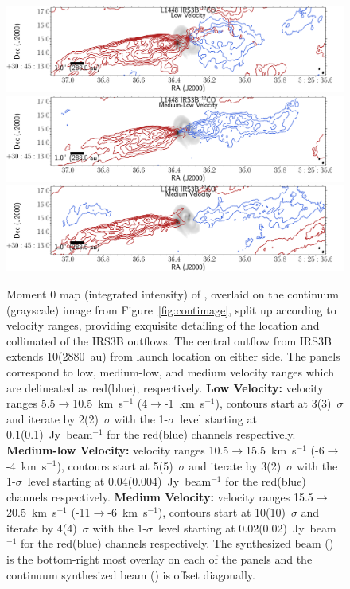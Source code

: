 

\begin{figure}[H]
   \begin{center}
   \includegraphics[width=\textwidth]{img/L1448IRS3B_12CO_image_binned_clean__ultralow.pdf}
   \includegraphics[width=\textwidth]{img/L1448IRS3B_12CO_image_binned_clean__low.pdf}
   \includegraphics[width=\textwidth]{img/L1448IRS3B_12CO_image_binned_clean__med.pdf}
   \caption{Moment 0 map (integrated intensity) of \co, overlaid on the continuum (grayscale) image from Figure~\ref{fig:contimage}, split up according to velocity ranges, providing exquisite detailing of the location and collimated of the IRS3B outflows. The central outflow from IRS3B extends 10\arcsec\space(2880~au) from launch location on either side. The panels correspond to low, medium-low, and medium velocity ranges which are delineated as red(blue), respectively. \textbf{Low Velocity:} velocity ranges 5.5$\rightarrow$10.5~km~s$^{-1}$ (4$\rightarrow$-1~km~s$^{-1}$), contours start at 3(3)~$\sigma$ and iterate by 2(2)~$\sigma$ with the 1-$\sigma$~level starting at 0.1(0.1)~Jy~beam$^{-1}$ for the red(blue) channels respectively. \textbf{Medium-low Velocity:} velocity ranges 10.5$\rightarrow$15.5~km~s$^{-1}$ (-6$\rightarrow$-4~km~s$^{-1}$), contours start at 5(5)~$\sigma$ and iterate by 3(2)~$\sigma$ with the 1-$\sigma$~level starting at 0.04(0.004)~Jy~beam$^{-1}$ for the red(blue) channels respectively. \textbf{Medium Velocity:} velocity ranges 15.5$\rightarrow$20.5~km~s$^{-1}$ (-11$\rightarrow$-6~km~s$^{-1}$), contours start at 10(10)~$\sigma$ and iterate by 4(4)~$\sigma$ with the 1-$\sigma$~level starting at 0.02(0.02)~Jy~beam$^{-1}$ for the red(blue) channels respectively. The \co\space synthesized beam (\cobeam) is the bottom-right most overlay on each of the panels and the continuum synthesized beam (\contbeam) is offset diagonally.}\label{fig:comomentmap}
\end{center}
\end{figure}
